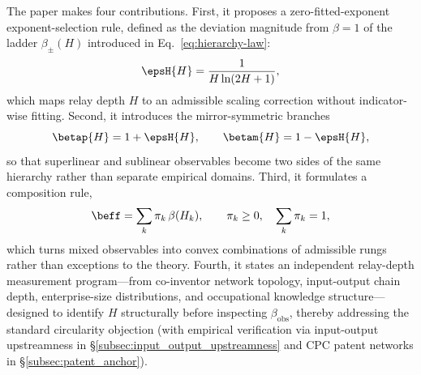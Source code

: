 The paper makes four contributions.
First, it proposes a zero-fitted-exponent exponent-selection rule, defined as the deviation magnitude from \(\beta=1\) of the ladder \(\beta_{\pm}(H)\) introduced in Eq.~\ref{eq:hierarchy-law}:
\begin{equation}
\epsH{H}=\frac{1}{H\ln(2H+1)},
\label{eq:epsilon}
\end{equation}
which maps relay depth \(H\) to an admissible scaling correction without
indicator-wise fitting.
Second, it introduces the mirror-symmetric branches
\begin{equation}
\betap{H}=1+\epsH{H}, \qquad \betam{H}=1-\epsH{H},
\label{eq:branches}
\end{equation}
so that superlinear and sublinear observables become two sides of the same
hierarchy rather than separate empirical domains.
Third, it formulates a composition rule,
\begin{equation}
\beff=\sum_k \pi_k\,\beta(H_k), \qquad \pi_k\ge 0,\quad \sum_k \pi_k=1,
\label{eq:mixture}
\end{equation}
which turns mixed observables into convex combinations of admissible rungs
rather than exceptions to the theory.
Fourth, it states an independent relay-depth measurement program---from
co-inventor network topology, input-output chain depth, enterprise-size
distributions, and occupational knowledge structure---designed to identify
\(H\) structurally before inspecting \(\beta_{\mathrm{obs}}\), thereby addressing
the standard circularity objection (with empirical verification via
input-output upstreamness in \S\ref{subsec:input_output_upstreamness} and CPC
patent networks in \S\ref{subsec:patent_anchor}).

